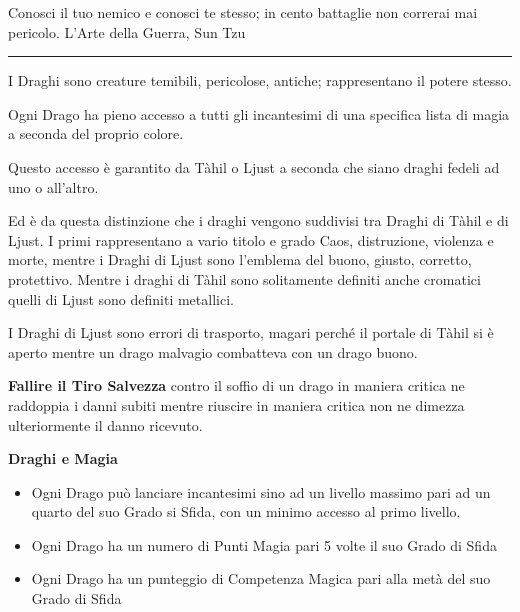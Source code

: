 \begin{multicols}{2}
{\medskip


\begin{enfasi}
	Conosci il tuo nemico e conosci te stesso; in cento battaglie non correrai mai pericolo. L'Arte della Guerra, Sun Tzu
\end{enfasi}

\rule{\linewidth}{2pt}

\medskip




I Draghi sono creature temibili, pericolose, antiche; rappresentano il potere stesso.

Ogni Drago ha pieno accesso a tutti gli incantesimi di una specifica lista di magia a seconda del proprio colore.

Questo accesso è garantito da Tàhil o Ljust a seconda che siano draghi fedeli ad uno o all'altro.

Ed è da questa distinzione che i draghi vengono suddivisi tra Draghi di Tàhil e di Ljust. I primi rappresentano a vario titolo e grado Caos, distruzione, violenza e morte, mentre i Draghi di Ljust sono l'emblema del buono, giusto, corretto, protettivo. Mentre i draghi di Tàhil sono solitamente definiti anche cromatici quelli di Ljust sono definiti metallici.

I Draghi di Ljust sono errori di trasporto, magari perché il portale di Tàhil si è aperto mentre un drago malvagio combatteva con un drago buono.

\textbf{Fallire il Tiro Salvezza} contro il soffio di un drago in maniera critica ne raddoppia i danni subiti mentre riuscire in maniera critica non ne dimezza ulteriormente il danno ricevuto.

\medskip

\textbf{Draghi e Magia}

\begin{itemize}[leftmargin=*] \setlength{\itemsep}{0pt}
	\item Ogni Drago può lanciare incantesimi sino ad un livello massimo pari ad un quarto del suo Grado si Sfida, con un minimo accesso al primo livello.
	\item Ogni Drago ha un numero di Punti Magia pari 5 volte il suo Grado di Sfida
	\item Ogni Drago ha un punteggio di Competenza Magica pari alla metà del suo Grado di Sfida
\end{itemize}

\medskip

}
\end{multicols}
